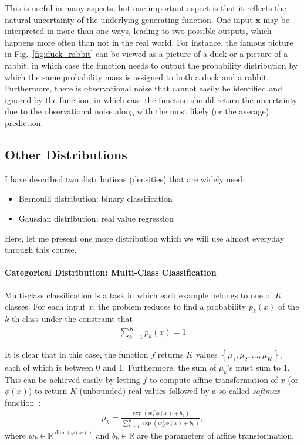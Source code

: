 \documentclass{report}
\newcommand{\vect}[1]{\mathbf{#1}}
\newcommand{\vx}[0]{\vect{x}}
\newcommand{\RR}[0]{\mathbb{R}}
\begin{document}
This is useful in many aspects, but one important aspect is that it reflects the
natural uncertainty of the underlying generating function. One input $\vx$ may
be interpreted in more than one ways, leading to two possible outputs, which
happens more often than not in the real world. For instance, the famous picture
in Fig.~\ref{fig:duck_rabbit} can be viewed as a picture of a duck or a picture
of a rabbit, in which case the function needs to output the probability
distribution by which the same probability mass is assigned to both a duck and a
rabbit. Furthermore, there is observational noise that cannot easily be
identified and ignored by the function, in which case the function should return
the uncertainty due to the observational noise along with the most likely (or
the average) prediction.

\subsection{Other Distributions}
\label{sec:other_dist}

I have described two distributions (densities) that are widely used: 
\begin{itemize}
    \itemsep 0em
    \item Bernoulli distribution: binary classification
    \item Gaussian distribution: real value regression
\end{itemize}
Here, let me present one more distribution which we will use almost everyday
through this course.

\paragraph{Categorical Distribution: Multi-Class Classification}

Multi-class classification is a task in which each example belongs to one of $K$
classes. For each input $x$, the problem reduces to find a probability $p_k(x)$
of the $k$-th class under the constraint that 
\begin{align*}
    \sum_{k=1}^K p_k(x)=1
\end{align*}

It is clear that in this case, the function $f$ returns $K$ values $\left\{
\mu_1, \mu_2, \ldots, \mu_K \right\}$, each of which is between $0$ and $1$.
Furthermore, the sum of $\mu_k$'s must sum to $1$. This can be achieved easily
by letting $f$ to compute affine transformation of $x$ (or $\phi(x)$) to return
$K$ (unbounded) real values followed by a so called {\em softmax}
function~\cite{Bridle1990}:
\begin{align}
    \label{eq:softmax}
    \mu_k = \frac{\exp(w_k^\top \phi(x) + b_k)}{\sum_{k'=1}^K \exp(w_{k'}^\top
    \phi(x) + b_k)},
\end{align}
where $w_k \in \RR^{\dim(\phi(x))}$ and $b_k \in \RR$ are the parameters of
affine transformation.
\end{document}
